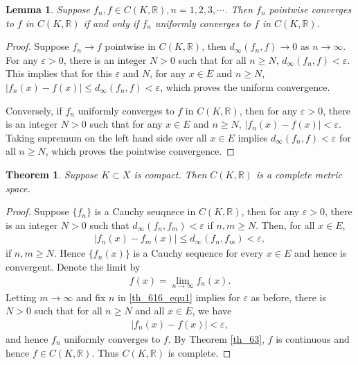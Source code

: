 \documentclass[11pt]{book}
\newtheorem{theorem}{Theorem}[chapter]
\newtheorem{lemma}{Lemma}[chapter]
\theoremstyle{definition}
\numberwithin{equation}{chapter}
\begin{document}
\medskip

\begin{lemma}\label{lemma_62}
Suppose $f_n, f \in C(K,\mathbb{R}), n = 1,2,3,\cdots$. Then $f_n$ pointwise converges to $f$ in $C(K,\mathbb{R})$ if and only if $f_n$ uniformly converges to $f$ in $C(K,\mathbb{R})$.
\end{lemma}
\begin{proof}
Suppose $f_n \to f$ pointwise in $C(K,\mathbb{R})$, then $d_{\infty}(f_n,f) \to 0$ as $n \to \infty$. For any $\varepsilon > 0$, there is an integer $N > 0$ such that for all $n \geq N$, $d_{\infty}(f_n,f) < \varepsilon$. This implies that for this $\varepsilon$ and $N$, for any $x \in E$ and $n \geq N$, $\left|f_n(x) - f(x)\right| \leq d_{\infty}(f_n,f) < \varepsilon$, which proves the uniform convergence.

Conversely, if $f_n$ uniformly converges to $f$ in $C(K,\mathbb{R})$, then for any $\varepsilon > 0$, there is an integer $N > 0$ such that for any $x \in E$ and $n \geq N$, $\left|f_n(x) - f(x)\right| < \varepsilon$. Taking supremum on the left hand side over all $x \in E$ implies $d_\infty(f_n,f) < \varepsilon$ for all $n \geq N$, which proves the pointwise convergence.
\end{proof}

\medskip

\begin{theorem}\label{th_616}
Suppose $K \subset X$ is compact. Then $C(K,\mathbb{R})$ is a complete metric space.
\end{theorem}
\begin{proof}
Suppose $\{f_n\}$ is a Cauchy seuqnece in $C(K,\mathbb{R})$, then for any $\varepsilon > 0$, there is an integer $N > 0$ such that $d_{\infty}(f_n,f_m) < \varepsilon$ if $n,m \geq N$. Then, for all $x \in E$, 
\begin{align}\label{th_616_equ1}
    \left|f_n(x) - f_m(x)\right| \leq d_{\infty}(f_n,f_m) < \varepsilon,
\end{align}
if $n,m \geq N$. Hence $\{f_n(x)\}$ is a Cauchy sequence for every $x \in E$ and hence is convergent. Denote the limit by 
\begin{align*}
    f(x) = \lim_{n\to\infty} f_n(x).
\end{align*}
Letting $m \to \infty$ and fix $n$ in \eqref{th_616_equ1} implies for $\varepsilon$ as before, there is $N > 0$ such that for all $n \geq N$ and all $x \in E$, we have
\begin{align*}
    \left|f_n(x) - f(x)\right| < \varepsilon,
\end{align*}
and hence $f_n$ uniformly converges to $f$. By  Theorem \ref{th_63}, $f$ is continuous and hence $f \in C(K,\mathbb{R})$. Thus $C(K,\mathbb{R})$ is complete.
\end{proof}
\end{document}
